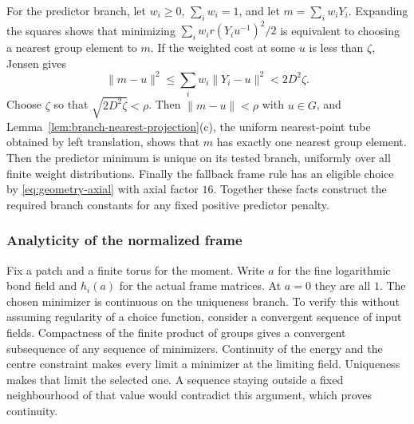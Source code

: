 For the predictor branch, let $w_i\ge0$, $\sum_iw_i=1$, and let
$m=\sum_iw_iY_i$. Expanding the squares shows that minimizing
$\sum_iw_i r(Y_iu^{-1})^2/2$ is equivalent to choosing a nearest
group element to $m$. If the weighted cost at some $u$ is less than
$\zeta$, Jensen gives
\[
 \|m-u\|^2\le\sum_iw_i\|Y_i-u\|^2<2D^2\zeta.
\]
Choose $\zeta$ so that $\sqrt{2D^2\zeta}<\rho$. Then $\|m-u\|<\rho$
with $u\in G$, and Lemma~\ref{lem:branch-nearest-projection}(c),
the uniform nearest-point tube obtained by left translation, shows
that $m$ has exactly one nearest group element. Then the predictor
minimum is unique on its tested branch, uniformly over all finite
weight distributions. Finally the fallback frame rule has an
eligible choice by \eqref{eq:geometry-axial} with axial factor $16$.
Together these facts construct the required branch constants for any
fixed positive predictor penalty.

\subsubsection{Analyticity of the normalized frame}
Fix a patch and a finite torus for the moment. Write $a$ for the
fine logarithmic bond field and $h_i(a)$ for the actual frame
matrices. At $a=0$ they are all $1$. The chosen minimizer is
continuous on the uniqueness branch. To verify this without assuming
regularity of a choice function, consider a convergent sequence of
input fields. Compactness of the finite product of groups gives a
convergent subsequence of any sequence of minimizers. Continuity of
the energy and the centre constraint makes every limit a minimizer
at the limiting field. Uniqueness makes that limit the selected
one. A sequence staying outside a fixed neighbourhood of that value
would contradict this argument, which proves continuity.

